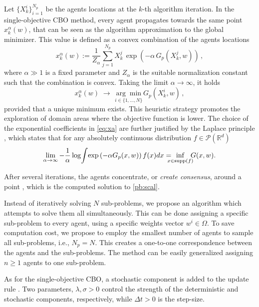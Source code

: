 \documentclass[letterpaper, 10 pt, conference]{ieeeconf}  %
\begin{document}
Let $\{X^i_k\}_{i=1}^{N_p}$ be 
the agents locations at the $k$-th algorithm iteration. 
In the single-objective CBO method, every agent propagates towards the same point $x_k^\alpha(w)$,
that can be seen as the algorithm approximation to the global minimizer. This value is defined as a convex combination of the agents locations
\begin{equation}
x^\alpha_k(w) := \frac1{Z_\alpha} \sum_{j=1}^{N_p} X^j_k \, \exp\left(-\alpha\, G_p(X^j_k, w)\right)\,,
\label{eq:xa}
\end{equation}
where $\alpha\gg 1$ is a fixed parameter and $Z_\alpha$ is the suitable normalization constant such that the combination is convex.  Taking the limit $\alpha \to \infty$, it holds
\[ x^\alpha_k(w) \;\longrightarrow\;  \underset{i\in\{1,\dots,N\}}{\arg \! \min} G_p(X^i_k, w) \,,
\]
provided that a unique minimum exists. This heuristic strategy promotes the exploration of domain areas where the objective function is lower. The choice of the exponential coefficients  in \eqref{eq:xa} are further justified by the Laplace principle \cite{Dembo2010}, which states that for any absolutely continuous distribution $f \in \mathcal{P}(\mathbb{R}^d)$
\[ \lim_{\alpha \to \infty} - \frac{1}\alpha \log\! \int \!\exp\left (-\alpha G_p(x, w)\right)f(x)dx 
= \hspace{-3mm}\inf_{x \in \textup{supp}(f)}\hspace{-2mm} G(x, w).
\]  



After several iterations, the agents concentrate, or \textit{create consensus}, around a point \cite{jin2020convergence}, which is the computed solution to \eqref{pb:scal}.

Instead of iteratively solving $N$ sub-problems, we propose an algorithm which attempts to solve them all simultaneously.  
This can be done assigning a specific sub-problem to every agent, using a specific weights vector $w^i \in \Omega$. To save computation cost, we propose to employ the smallest number of agents to sample all sub-problems, i.e., $N_p=N$. This creates a one-to-one correspondence between the agents and the sub-problems. The method can be easily generalized assigning $n \geq 1$ agents to one sub-problem.

As for the single-objective CBO, a stochastic component is added to the update rule \cite{pinnau2017consensus}.  Two parameters, $\lambda, \sigma >0 $ control the strength of the deterministic and stochastic components, respectively, while $\Delta t>0$ is the step-size.
\end{document}
